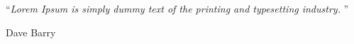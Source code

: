
\vspace*{0.2\textheight}

\noindent\enquote{\itshape Lorem Ipsum is simply dummy text of the printing and typesetting industry. }\bigbreak

\hfill Dave Barry